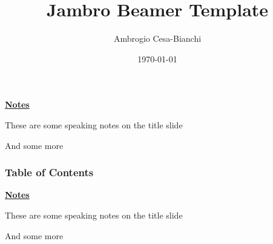 \documentclass[10pt]{beamer}
\title[]{Jambro Beamer Template}
\author[]{Ambrogio Cesa-Bianchi}
\date{\today}
\begin{document}
\begin{frame}[plain]
\end{frame}
\begin{flushleft}
    \underline{\textbf{Notes}}\setlength{\parskip}{.15cm}\notesize\newline\par
    These are some speaking notes on the title slide \par
    And some more 
\end{flushleft}

\begin{frame}
    \frametitle{Table of Contents}
    \tableofcontents
\end{frame}
\begin{flushleft}
    \underline{\textbf{Notes}}\setlength{\parskip}{.15cm}\notesize\newline\par
    These are some speaking notes on the title slide \par
    And some more 
\end{flushleft}

\end{document}
